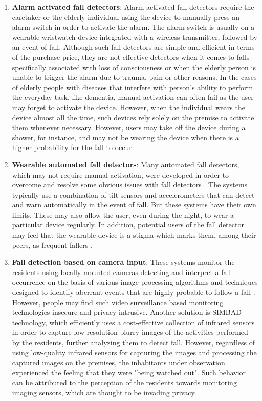 \begin{enumerate}
\item  \textbf{Alarm activated fall detectors}: Alarm activated fall detectors require the caretaker or the elderly individual using the device to manually press an alarm switch in order to activate the alarm. The alarm switch is usually on a wearable wristwatch device integrated with a wireless transmitter, followed by an event of fall. Although such fall detectors are simple and efficient in terms of the purchase price, they are not effective detectors when it comes to falls specifically associated with loss of consciousness or when the elderly person is unable to trigger the alarm due to trauma, pain or other reasons. In the cases of elderly people with diseases that interfere with person's ability to perform the everyday task, like dementia, manual activation can often fail as the user may forget to activate the device. However, when the individual wears the device almost all the time, such devices rely solely on the premise to activate them whenever necessary. However, users may take off the device during a shower, for instance, and may not be wearing the device when there is a higher probability for the fall to occur.
 
\item  \textbf{Wearable automated fall detectors}: Many automated fall detectors, which may not require manual activation, were developed in order to overcome and resolve some obvious issues with fall detectors \cite{21,22}. The systems typically use a combination of tilt sensors and accelerometers that can detect and warn automatically in the event of fall. But these systems have their own limits. These may also allow the user, even during the night, to wear a particular device regularly. In addition, potential users of the fall detector may feel that the wearable device is a stigma which marks them, among their peers, as frequent fallers  \cite{23}.

\item  \textbf{Fall detection based on camera input}: These systems monitor the residents using locally mounted cameras detecting and interpret a fall occurrence on the basis of various image processing algorithms and techniques designed to identify aberrant events that are highly probable to follow a fall \cite{22}. However, people may find such video surveillance based monitoring technologies insecure and privacy-intrusive. Another solution is SIMBAD \cite{24} technology, which efficiently uses a cost-effective collection of infrared sensors in order to capture low-resolution blurry images of the activities performed by the residents, further analyzing them to detect fall. However, regardless of using low-quality infrared sensors for capturing the images and processing the captured images on the premises, the inhabitants under observation experienced the feeling that they were "being watched out". Such behavior can be attributed to the perception of the residents towards monitoring imaging sensors, which are thought to be invading privacy.


\end{enumerate}
